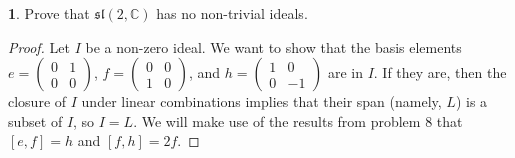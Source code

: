 \documentclass[12pt]{article}
\renewcommand{\sl}{\mathfrak{sl}}
\theoremstyle{definition}
\newtheorem{ex}{}
\begin{document}
\begin{ex}
	Prove that $\sl(2, \mathbb{C})$ has no non-trivial ideals.
\end{ex}
\begin{proof}
	Let $I$ be a non-zero ideal.
	We want to show that the basis elements $e=\begin{pmatrix}0&1\\0&0\end{pmatrix}$, $f=\begin{pmatrix}0&0\\1&0\end{pmatrix}$, and $h=\begin{pmatrix}1&0\\0&-1\end{pmatrix}$ are in $I$.
	If they are, then the closure of $I$ under linear combinations implies that their span (namely, $L$) is a subset of $I$, so $I = L$.
  We will make use of the results from problem 8 that $[e, f] = h$ and $[f, h] = 2f$.


\end{proof}
\end{document}
